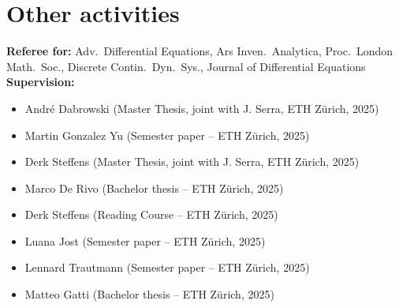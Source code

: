 \documentclass[a4paper,11pt]{article}
\begin{document}
\vspace{5mm}

\section*{Other activities}
\noindent
\textbf{Referee for:} Adv.\ Differential Equations, Ars Inven.\ Analytica, Proc.\ London Math.\ Soc., Discrete Contin.\ Dyn.\ Sys., Journal of Differential Equations\\

\noindent
\textbf{Supervision:}
\begin{itemize}
    \item Andr\'e Dabrowski (Master Thesis, joint with J. Serra, ETH Z\"urich, 2025)
    \item Martin Gonzalez Yu (Semester paper -- ETH Z\"urich, 2025)
    \item Derk Steffens (Master Thesis, joint with J. Serra, ETH Z\"urich, 2025)
    \item Marco De Rivo (Bachelor thesis -- ETH Z\"urich, 2025)
    \item Derk Steffens (Reading Course -- ETH Z\"urich, 2025)
    \item Luana Jost (Semester paper -- ETH Z\"urich, 2025)
    \item Lennard Trautmann (Semester paper -- ETH Z\"urich, 2025)
    \item Matteo Gatti (Bachelor thesis -- ETH Z\"urich, 2025)
\end{itemize}

\vspace{5mm}
\end{document}
